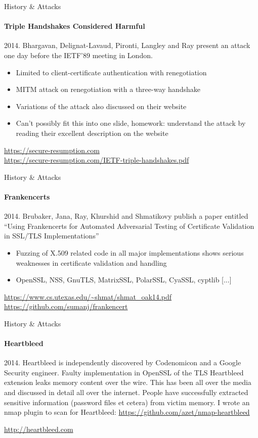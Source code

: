 \documentclass[hyperref={draft}]{beamer}
\begin{document}
\begin{frame}{History \& Attacks}
  \framesubtitle{Triple Handshakes Considered Harmful}
  2014. Bhargavan, Delignat-Lavaud, Pironti, Langley and Ray present an attack one day before the IETF'89 meeting in London.
  \begin{itemize}
    \item Limited to client-certificate authentication with renegotiation
    \item MITM attack on renegotiation with a three-way handshake
    \item Variations of the attack also discussed on their website
    \item Can't possibly fit this into one slide, homework: understand the attack by reading their excellent description on the website
  \end{itemize}

  
  \vspace{50px}

  \tiny
  \url{https://secure-resumption.com}\\
  \url{https://secure-resumption.com/IETF-triple-handshakes.pdf}
\end{frame}

\begin{frame}{History \& Attacks}
  \framesubtitle{Frankencerts}
  2014. Brubaker, Jana, Ray, Khurshid and Shmatikovy publish a paper entitled ``Using Frankencerts for Automated Adversarial Testing of Certificate Validation in SSL/TLS Implementations''
  \begin{itemize}
    \item Fuzzing of X.509 related code in all major implementations shows serious weaknesses in certificate validation and handling
    \item OpenSSL, NSS, GnuTLS, MatrixSSL, PolarSSL, CyaSSL, cyptlib [...]
  \end{itemize}

  
  \vspace{50px}

  \tiny
  \url{https://www.cs.utexas.edu/~shmat/shmat_oak14.pdf}\\
  \url{https://github.com/sumanj/frankencert}
\end{frame}

\begin{frame}{History \& Attacks}
  \framesubtitle{Heartbleed}
  2014. Heartbleed is independently discovered by Codenomicon and a Google Security engineer.
  \newline
  \newline
  Faulty implementation in OpenSSL of the TLS Heartbleed extension leaks memory content over the wire. This has been all over the media and discussed in detail all over the internet. People have successfully extracted sensitive information (password files et cetera) from victim memory.
  \newline
  \newline
  I wrote an nmap plugin to scan for Heartbleed: \url{https://github.com/azet/nmap-heartbleed}

  \vspace{30px}

  \tiny
  \url{http://heartbleed.com}
\end{frame}
\end{document}
